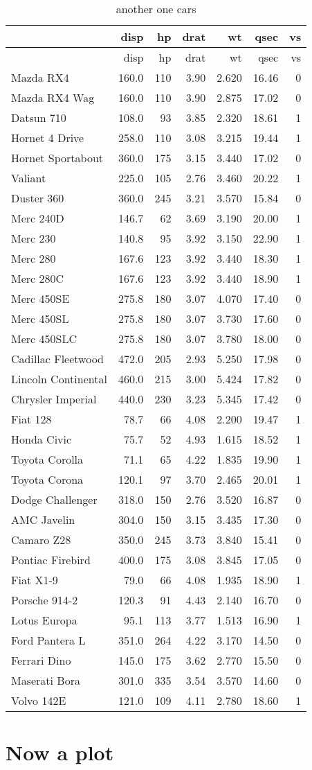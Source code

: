 \documentclass[]{article}
\begin{document}
\begin{longtable}[]{@{}lrrrrrr@{}}
\caption{another one cars}\tabularnewline
\toprule
& disp & hp & drat & wt & qsec & vs\tabularnewline
\midrule
\endfirsthead
\toprule
& disp & hp & drat & wt & qsec & vs\tabularnewline
\midrule
\endhead
Mazda RX4 & 160.0 & 110 & 3.90 & 2.620 & 16.46 & 0\tabularnewline
Mazda RX4 Wag & 160.0 & 110 & 3.90 & 2.875 & 17.02 & 0\tabularnewline
Datsun 710 & 108.0 & 93 & 3.85 & 2.320 & 18.61 & 1\tabularnewline
Hornet 4 Drive & 258.0 & 110 & 3.08 & 3.215 & 19.44 & 1\tabularnewline
Hornet Sportabout & 360.0 & 175 & 3.15 & 3.440 & 17.02 &
0\tabularnewline
Valiant & 225.0 & 105 & 2.76 & 3.460 & 20.22 & 1\tabularnewline
Duster 360 & 360.0 & 245 & 3.21 & 3.570 & 15.84 & 0\tabularnewline
Merc 240D & 146.7 & 62 & 3.69 & 3.190 & 20.00 & 1\tabularnewline
Merc 230 & 140.8 & 95 & 3.92 & 3.150 & 22.90 & 1\tabularnewline
Merc 280 & 167.6 & 123 & 3.92 & 3.440 & 18.30 & 1\tabularnewline
Merc 280C & 167.6 & 123 & 3.92 & 3.440 & 18.90 & 1\tabularnewline
Merc 450SE & 275.8 & 180 & 3.07 & 4.070 & 17.40 & 0\tabularnewline
Merc 450SL & 275.8 & 180 & 3.07 & 3.730 & 17.60 & 0\tabularnewline
Merc 450SLC & 275.8 & 180 & 3.07 & 3.780 & 18.00 & 0\tabularnewline
Cadillac Fleetwood & 472.0 & 205 & 2.93 & 5.250 & 17.98 &
0\tabularnewline
Lincoln Continental & 460.0 & 215 & 3.00 & 5.424 & 17.82 &
0\tabularnewline
Chrysler Imperial & 440.0 & 230 & 3.23 & 5.345 & 17.42 &
0\tabularnewline
Fiat 128 & 78.7 & 66 & 4.08 & 2.200 & 19.47 & 1\tabularnewline
Honda Civic & 75.7 & 52 & 4.93 & 1.615 & 18.52 & 1\tabularnewline
Toyota Corolla & 71.1 & 65 & 4.22 & 1.835 & 19.90 & 1\tabularnewline
Toyota Corona & 120.1 & 97 & 3.70 & 2.465 & 20.01 & 1\tabularnewline
Dodge Challenger & 318.0 & 150 & 2.76 & 3.520 & 16.87 & 0\tabularnewline
AMC Javelin & 304.0 & 150 & 3.15 & 3.435 & 17.30 & 0\tabularnewline
Camaro Z28 & 350.0 & 245 & 3.73 & 3.840 & 15.41 & 0\tabularnewline
Pontiac Firebird & 400.0 & 175 & 3.08 & 3.845 & 17.05 & 0\tabularnewline
Fiat X1-9 & 79.0 & 66 & 4.08 & 1.935 & 18.90 & 1\tabularnewline
Porsche 914-2 & 120.3 & 91 & 4.43 & 2.140 & 16.70 & 0\tabularnewline
Lotus Europa & 95.1 & 113 & 3.77 & 1.513 & 16.90 & 1\tabularnewline
Ford Pantera L & 351.0 & 264 & 4.22 & 3.170 & 14.50 & 0\tabularnewline
Ferrari Dino & 145.0 & 175 & 3.62 & 2.770 & 15.50 & 0\tabularnewline
Maserati Bora & 301.0 & 335 & 3.54 & 3.570 & 14.60 & 0\tabularnewline
Volvo 142E & 121.0 & 109 & 4.11 & 2.780 & 18.60 & 1\tabularnewline
\bottomrule
\end{longtable}

\section{Now a plot}\label{now-a-plot-1}
\end{document}
